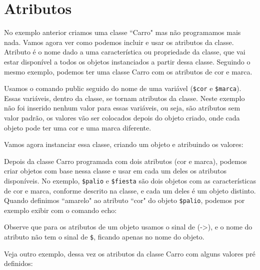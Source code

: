 


\section{Atributos}
\label{atributos}

No exemplo anterior criamos uma classe ``Carro" mas não programamos mais nada. Vamos agora 
ver como podemos incluir e usar os atributos da classe. Atributo é o nome dado a uma 
característica ou propriedade da classe, que vai estar disponível a todos os objetos 
instanciados a partir dessa classe. Seguindo o mesmo exemplo, podemos ter uma classe Carro 
com os atributos de cor e marca.



Usamos o comando public seguido do nome de uma variável (\texttt{\$cor} e \texttt{\$marca}). 
Essas variáveis, dentro da classe, se tornam atributos da classe. Neste exemplo não foi 
inserido nenhum valor para essas variáveis, ou seja, são atributos sem valor padrão, os 
valores vão ser colocados depois do objeto criado, onde cada objeto pode ter uma cor e uma 
marca diferente.

Vamos agora instanciar essa classe, criando um objeto e atribuindo os valores:



Depois da classe Carro programada com dois atributos (cor e marca), podemos criar objetos 
com base nessa classe e usar em cada um deles os atributos disponíveis. No exemplo, 
\texttt{\$palio} e \texttt{\$fiesta} são dois objetos com as características de cor e marca, 
conforme descrito na classe, e cada um deles é um objeto distinto. Quando definimos 
``amarelo" ao atributo ``cor" do objeto \texttt{\$palio}, podemos por exemplo exibir com 
o comando echo:



Observe que para os atributos de um objeto usamos o sinal de (->), e o nome do atributo 
não tem o sinal de \texttt{\$}, ficando apenas no nome do objeto. 

Veja outro exemplo, dessa vez os atributos da classe Carro com alguns valores pré definidos:




